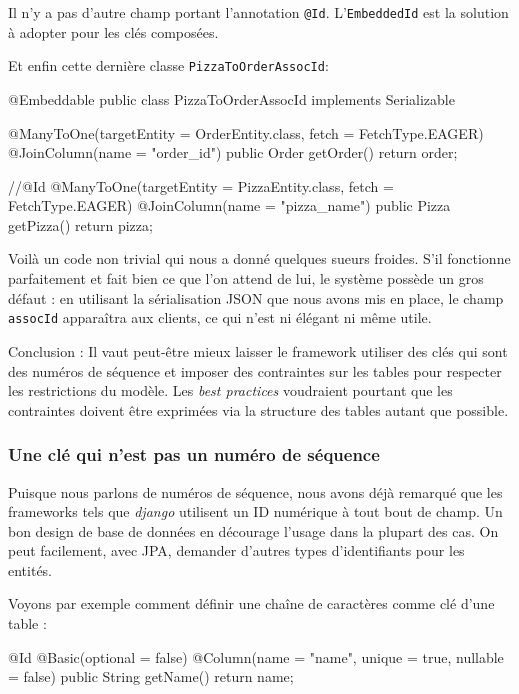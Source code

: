 Il n'y a pas d'autre champ portant l'annotation \verb|@Id|. L'\verb|EmbeddedId| est la solution
à adopter pour les clés composées.

Et enfin cette dernière classe \verb|PizzaToOrderAssocId|:

\begin{javacode}
@Embeddable
public class PizzaToOrderAssocId implements Serializable {
    @ManyToOne(targetEntity = OrderEntity.class, fetch = FetchType.EAGER)
    @JoinColumn(name = "order_id")
    public Order getOrder() {
        return order;
    }

    //@Id
    @ManyToOne(targetEntity = PizzaEntity.class, fetch = FetchType.EAGER)
    @JoinColumn(name = "pizza_name")
    public Pizza getPizza() {
        return pizza;
    }
}
\end{javacode}

Voilà un code non trivial qui nous a donné quelques sueurs froides.
S'il fonctionne parfaitement et fait bien ce que l'on attend de lui, 
le système possède un gros défaut : en utilisant la sérialisation JSON que nous avons mis en place, 
le champ \verb|assocId| apparaîtra aux clients, ce qui n'est ni élégant ni même utile.

Conclusion : Il vaut peut-être mieux laisser le framework utiliser des clés qui sont des numéros de séquence
et imposer des contraintes sur les tables pour respecter les restrictions du modèle. Les \emph{best practices}
voudraient pourtant que les contraintes doivent être exprimées via la structure des tables autant que possible.


\subsubsection{Une clé qui n'est pas un numéro de séquence}

Puisque nous parlons de numéros de séquence, nous avons déjà remarqué que les frameworks tels que \emph{django}
utilisent un ID numérique à tout bout de champ. Un bon design de base de données en décourage l'usage
dans la plupart des cas. On peut facilement, avec JPA, demander d'autres types d'identifiants pour les entités.

Voyons par exemple comment définir une chaîne de caractères comme clé d'une table :

\begin{javacode}
    @Id
    @Basic(optional = false)
    @Column(name = "name", unique = true, nullable = false)
    public String getName() {
        return name;
    }
\end{javacode}

